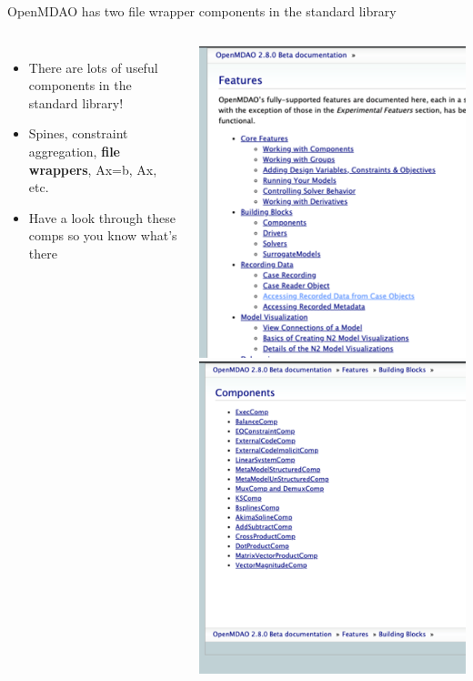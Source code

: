\documentclass[aspectratio=169, usenames,dvipsnames, 14pt]{beamer}
\begin{document}
\begin{frame}{OpenMDAO has two file wrapper components in the standard library}
	\begin{columns}
			\begin{itemize}
				\item \small There are lots of useful components in the standard library!
				\item \small Spines, constraint aggregation, \textbf{file wrappers}, Ax=b, Ax, etc.
				\item \small Have a look through these comps so you know what's there
			\end{itemize}
			\includegraphics[scale=.5]{images/slide_109a.png}
			\includegraphics[scale=.5]{images/slide_109b.png}
	\end{columns}

\end{frame}
\end{document}
